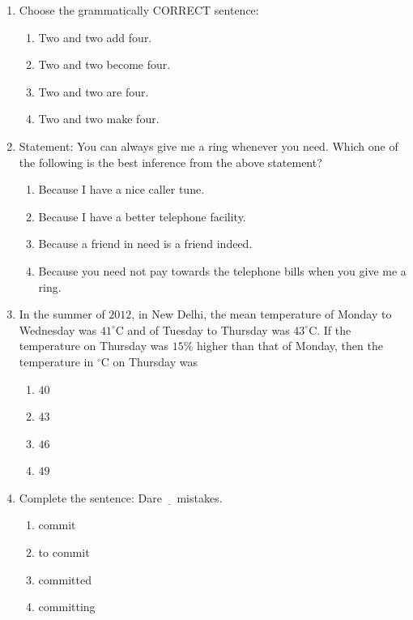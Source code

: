 \documentclass[journal,12pt,onecolumn]{IEEEtran}
\theoremstyle{remark}
\begin{document}
\begin{enumerate}
\item Choose the grammatically CORRECT sentence:
\begin{enumerate}
\item Two and two add four.
\item Two and two become four.
\item Two and two are four.
\item Two and two make four.
\end{enumerate}
\hfill {}

\item Statement: You can always give me a ring whenever you need.  
Which one of the following is the best inference from the above statement?
\begin{enumerate}
\item Because I have a nice caller tune.
\item Because I have a better telephone facility.
\item Because a friend in need is a friend indeed.
\item Because you need not pay towards the telephone bills when you give me a ring.
\end{enumerate}
\hfill {}

\item In the summer of $2012$, in New Delhi, the mean temperature of Monday to Wednesday was $41^\circ\text{C}$ and of Tuesday to Thursday was $43^{\circ}\text{C}$. If the temperature on Thursday was $15 \%$ higher than that of Monday, then the temperature in $^\circ\text{C}$ on Thursday was
\begin{multicols}{4}
\begin{enumerate}
\item $40$
\item $43$
\item $46$
\item $49$
\end{enumerate}
\end{multicols}
\hfill {}

\item Complete the sentence: Dare $\underline{\ \ \ } $ mistakes.
\begin{multicols}{4}
\begin{enumerate}
\item commit
\item to commit
\item committed
\item committing
\end{enumerate}
\end{multicols}
\hfill {}


\end{enumerate}
\end{document}
